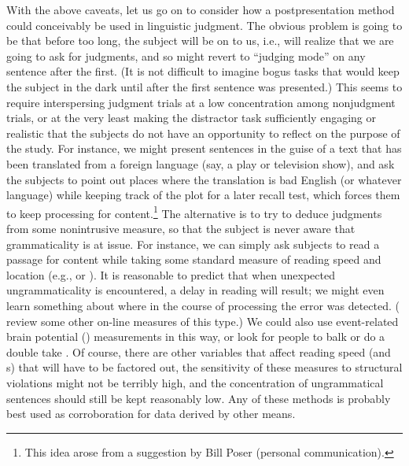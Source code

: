 With the above caveats, let us go on to consider how a postpresentation method could conceivably be used in linguistic judgment. The obvious problem is going to be that before too long, the subject will be on to us, i.e., will realize that we are going to ask for judgments, and so might revert to ``judging mode'' on any
sentence after the first. (It is not difficult to imagine bogus tasks that would keep the subject in the dark until after the first sentence was presented.) This seems to require interspersing judgment trials at a low concentration among nonjudgment trials, or at the very least making the distractor task sufficiently engaging or realistic that the subjects do not have an opportunity to reflect on the purpose of the study. For instance, we might present sentences in the guise of a text that has been translated from a foreign language (say, a play or television show), and ask the subjects to point out places where the translation is bad English (or whatever language) while keeping track of the plot for a later recall test, which forces them to keep processing for content.\footnote{This idea arose from a suggestion by Bill Poser (personal communication).}
 The alternative is to try to deduce judgments from some nonintrusive measure, so that the subject is never aware that grammaticality is at issue. For instance, we can simply ask subjects to read a passage for content while taking some standard measure of reading speed and location (e.g.,  or ). It is reasonable to predict that when unexpected ungrammaticality is encountered, a delay in reading will result; we might even learn something about where in the course of processing the error was detected. (\citet{KutasEtAl1983} review some other on-line measures of this type.) We could also use event-related brain potential () measurements in this way, or look for people to balk or do a double take \citep{Newmeyer1983}. Of course, there are other variables that affect reading speed (and s) that will have to be factored out, the sensitivity of these measures to structural violations might not be terribly high, and the concentration of ungrammatical sentences should still be kept reasonably low. Any of these methods is probably best used as corroboration for data derived by other means.

